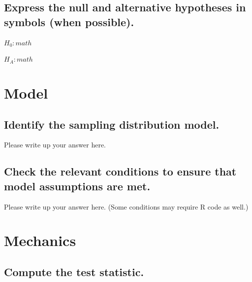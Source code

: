 \documentclass[
]{book}
\begin{document}
\hypertarget{express-the-null-and-alternative-hypotheses-in-symbols-when-possible.-2}{%
\subsection*{Express the null and alternative hypotheses in symbols (when possible).}\label{express-the-null-and-alternative-hypotheses-in-symbols-when-possible.-2}}

\(H_{0}: math\)

\(H_{A}: math\)

\hypertarget{model-2}{%
\section*{Model}\label{model-2}}

\hypertarget{identify-the-sampling-distribution-model.-2}{%
\subsection*{Identify the sampling distribution model.}\label{identify-the-sampling-distribution-model.-2}}

Please write up your answer here.

\hypertarget{check-the-relevant-conditions-to-ensure-that-model-assumptions-are-met.-3}{%
\subsection*{Check the relevant conditions to ensure that model assumptions are met.}\label{check-the-relevant-conditions-to-ensure-that-model-assumptions-are-met.-3}}

Please write up your answer here. (Some conditions may require R code as well.)

\hypertarget{mechanics-2}{%
\section*{Mechanics}\label{mechanics-2}}

\hypertarget{compute-the-test-statistic.-2}{%
\subsection*{Compute the test statistic.}\label{compute-the-test-statistic.-2}}
\end{document}
